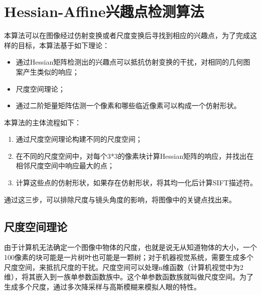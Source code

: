 % 
\chapter{Hessian-Affine兴趣点检测算法}
\label{chap:algorithm}
  本算法可以在图像经过仿射变换或者尺度变换后寻找到相应的兴趣点，为了完成这样的目标，本算法基于如下理论\cite{mikolajczyk2004scale}：
  \begin{itemize}
    \item 通过Hessian矩阵检测出的兴趣点可以抵抗仿射变换的干扰，对相同的几何图案产生类似的响应；
    \item 尺度空间理论；
    \item 通过二阶矩量矩阵估测一个像素和哪些临近像素可以构成一个仿射形状。
  \end{itemize}
  本算法的主体流程如下\cite{Perdoch-CVPR-2009}：
  \begin{enumerate}
    \item 通过尺度空间理论构建不同的尺度空间；
    \item 在不同的尺度空间中，对每个3*3的像素块计算Hessian矩阵的响应，并找出在相邻尺度空间中响应最大的点；
    \item 计算这些点的仿射形状，如果存在仿射形状，将其均一化后计算SIFT描述符。
  \end{enumerate}
  通过这三步，可以排除尺度与镜头角度的影响，将图像中的关键点找出来。
  \section{尺度空间理论}
    由于计算机无法确定一个图像中物体的尺度，也就是说无从知道物体的大小，一个100像素的块可能是一片树叶也可能是一颗树；对于机器视觉系统，需要生成多个尺度空间，来抵抗尺度的干扰。尺度空间可以处理n维函数（计算机视觉中为2维），将其嵌入到一族单参数函数族中。这个单参数函数族就叫做尺度空间。为了生成多个尺度，通过多次降采样与高斯模糊来模拟人眼的特性。
